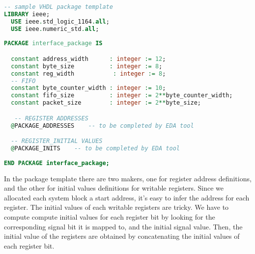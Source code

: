 \begin{lstlisting}[language=VHDL]
-- sample VHDL package template
LIBRARY ieee;
  USE ieee.std_logic_1164.all;
  USE ieee.numeric_std.all;
  
PACKAGE interface_package IS

  constant address_width      : integer := 12;
  constant byte_size          : integer := 8;
  constant reg_width           : integer := 8;
  -- FIFO
  constant byte_counter_width : integer := 10;
  constant fifo_size          : integer := 2**byte_counter_width;
  constant packet_size        : integer := 2**byte_size;

   -- REGISTER ADDRESSES
  @PACKAGE_ADDRESSES    -- to be completed by EDA tool

  -- REGISTER_INITIAL VALUES
  @PACKAGE_INITS    -- to be completed by EDA tool
  
END PACKAGE interface_package;
\end{lstlisting}

In the package template there are two makers, one for register address definitions, and the other for initial values definitions for writable registers. Since we allocated each system block a start address, it's easy to infer the address for each register. The initial values of each writable registers are tricky. We have to compute compute initial values for each register bit by looking for the corresponding signal bit it is mapped to, and the initial signal value. Then, the initial value of the registers are obtained by concatenating the initial values of each register bit.

